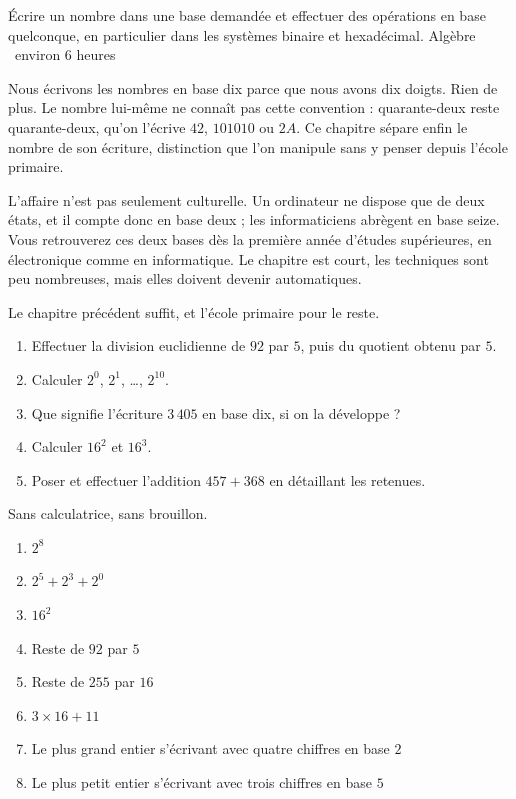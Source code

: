   {Écrire un nombre dans une base demandée et effectuer des opérations en base
   quelconque, en particulier dans les systèmes binaire et hexadécimal.}
  {Algèbre \textbullet\ environ 6 heures}

Nous écrivons les nombres en base dix parce que nous avons dix doigts. Rien de
plus. Le nombre lui-même ne connaît pas cette convention : quarante-deux reste
quarante-deux, qu'on l'écrive $42$, $101010$ ou $2A$. Ce chapitre sépare enfin
le nombre de son écriture, distinction que l'on manipule sans y penser depuis
l'école primaire.

L'affaire n'est pas seulement culturelle. Un ordinateur ne dispose que de deux
états, et il compte donc en base deux ; les informaticiens abrègent en base
seize. Vous retrouverez ces deux bases dès la première année d'études
supérieures, en électronique comme en informatique. Le chapitre est court, les
techniques sont peu nombreuses, mais elles doivent devenir automatiques.

\begin{revision}
Le chapitre précédent suffit, et l'école primaire pour le reste.

\begin{enumerate}[label=\textbf{\arabic*.}, leftmargin=*, itemsep=0.35em]
  \item Effectuer la division euclidienne de $92$ par $5$, puis du quotient
        obtenu par $5$.
  \item Calculer $2^{0}$, $2^{1}$, \dots, $2^{10}$.
  \item Que signifie l'écriture $3\,405$ en base dix, si on la développe ?
  \item Calculer $16^{2}$ et $16^{3}$.
  \item Poser et effectuer l'addition $457+368$ en détaillant les retenues.
\end{enumerate}
\end{revision}

\begin{automatismes}
Sans calculatrice, sans brouillon.

\begin{enumerate}[label=\textbf{\alph*)}, leftmargin=*, itemsep=0.25em]
  \item $2^{8}$
  \item $2^{5}+2^{3}+2^{0}$
  \item $16^{2}$
  \item Reste de $92$ par $5$
  \item Reste de $255$ par $16$
  \item $3 \times 16+11$
  \item Le plus grand entier s'écrivant avec quatre chiffres en base $2$
  \item Le plus petit entier s'écrivant avec trois chiffres en base $5$
\end{enumerate}
\end{automatismes}


